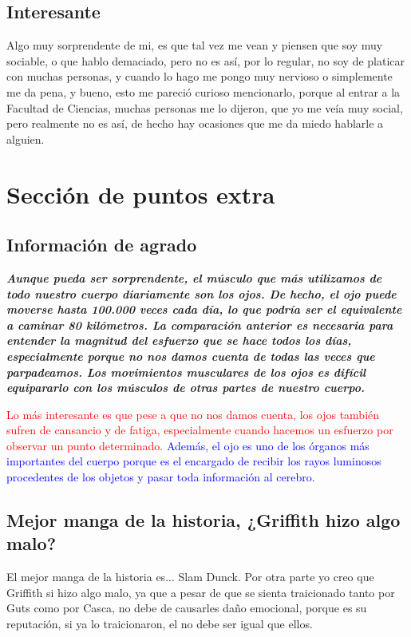 \documentclass[letterpaper,12pt]{article}
\begin{document}
    \subsection{\Large{Interesante}} \large{Algo muy sorprendente de mi, es que tal vez me vean y piensen que soy muy sociable, o que hablo demaciado, pero no es así, por lo regular, no soy de platicar con muchas personas, y cuando lo hago me pongo muy nervioso o simplemente me da pena, y bueno, esto me pareció curioso mencionarlo, porque al entrar a la Facultad de Ciencias, muchas personas me lo dijeron, que yo me veía muy social, pero realmente no es así, de hecho hay ocasiones que me da miedo hablarle a alguien.}
    
\section{\huge{Sección de puntos extra}}
    \subsection{\Large{Información de agrado}} \large{\textit{{\textbf{Aunque pueda ser sorprendente, el músculo que más utilizamos de todo nuestro cuerpo diariamente son los ojos. De hecho, el ojo puede moverse hasta 100.000 veces cada día, lo que podría ser el equivalente a caminar 80 kilómetros. La comparación anterior es necesaria para entender la magnitud del esfuerzo que se hace todos los días, especialmente porque no nos damos cuenta de todas las veces que parpadeamos. Los movimientos musculares de los ojos es difícil equipararlo con los músculos de otras partes de nuestro cuerpo.}}}

    \textcolor{red}{Lo más interesante es que pese a que no nos damos cuenta, los ojos también sufren de cansancio y de fatiga, especialmente cuando hacemos un esfuerzo por observar un punto determinado.} \textcolor{blue}{Además, el ojo es uno de los órganos más importantes del cuerpo porque es el encargado de recibir los rayos luminosos procedentes de los objetos y pasar toda información al cerebro.}}

\subsection{\Large{Mejor manga de la historia, ¿Griffith hizo algo malo?}}\large{El mejor manga de la historia es...} \huge{Slam Dunck}. \large{Por otra parte yo creo que Griffith si hizo algo malo, ya que a pesar de que se sienta traicionado tanto por Guts como por Casca, no debe de causarles daño emocional, porque es su reputación, si ya lo traicionaron, el no debe ser igual que ellos.} 
\end{document}
